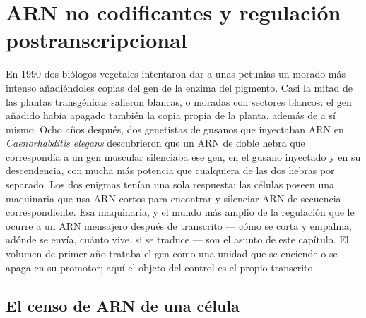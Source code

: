 \chapter{ARN no codificantes y regulación postranscripcional}\label{ch:b3:rna-regulation}

En 1990 dos biólogos vegetales intentaron dar a unas petunias un morado
más intenso añadiéndoles copias del gen de la enzima del pigmento. Casi
la mitad de las plantas transgénicas salieron blancas, o moradas con
sectores blancos: el gen añadido había apagado también la copia propia de
la planta, además de a sí mismo. Ocho años después, dos genetistas de
gusanos que inyectaban ARN en \emph{Caenorhabditis elegans} descubrieron
que un ARN de doble hebra que correspondía a un gen muscular silenciaba
ese gen, en el gusano inyectado y en su descendencia, con mucha más
potencia que cualquiera de las dos hebras por separado. Los dos enigmas
tenían una sola respuesta: las células poseen una maquinaria que usa ARN
cortos para encontrar y silenciar ARN de secuencia correspondiente. Esa
maquinaria, y el mundo más amplio de la regulación que le ocurre a un ARN
mensajero después de transcrito --- cómo se corta y empalma, adónde se
envía, cuánto vive, si se traduce --- son el asunto de este capítulo. El
volumen de primer año trataba el gen como una unidad que se enciende o se
apaga en su promotor; aquí el objeto del control es el propio transcrito.

\section{El censo de ARN de una célula}


